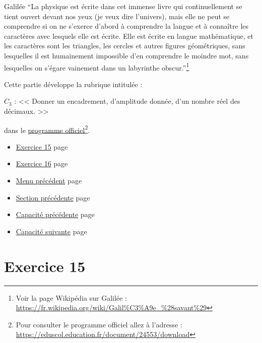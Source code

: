 \documentclass[a4paper,11pt]{book}
\begin{document}
\begin{myquote}{Galilée}
\enquote{La physique est écrite dans cet immense livre qui continuellement
se tient ouvert devant nos yeux (je veux dire l'univers), mais elle
ne peut se comprendre si on ne s'exerce d'abord à comprendre la
langue et à connaître les caractères avec lesquels elle est
écrite. Elle est écrite en langue mathématique, et les caractères
sont les triangles, les cercles et autres figures géométriques,
sans lesquelles il est humainement impossible d'en comprendre le
moindre mot, sans lesquelles on s'égare vainement dans un
labyrinthe obscur.}\footnote{Voir la page Wikipédia sur Galilée : \url{https://fr.wikipedia.org/wiki/Galil\%C3\%A9e_\%28savant\%29}}
\end{myquote}

\clearpage

Cette partie développe la rubrique intitulée :

\(C_{3}\) : << Donner un encadrement, d'amplitude
donnée, d'un nombre réel des décimaux. >>


dans le \href{https://eduscol.education.fr/document/24553/download}{programme officiel}\footnote{Pour consulter le programme officiel allez à l'adresse :
\url{https://eduscol.education.fr/document/24553/download}}.
\clearpage

\label{org67109aa}
\label{page:capacity3}
\begin{itemize}
\item \hyperref[org8cc10b8]{Exercice 15} page \pageref{page:sec3.4.1exo15}
\item \hyperref[org70c1962]{Exercice 16} page \pageref{page:sec3.4.2exo16}
\item \hyperref[orgb90956a]{Menu précédent} page \pageref{page:capacities-menu}
\item \hyperref[org7d5ffab]{Section précédente} page \pageref{page:sec3.3.2exo14}
\item \hyperref[org3ab5664]{Capacité précédente} page \pageref{page:sec3.3capacity2}
\item \hyperref[org67b7ea7]{Capacité suivante} page \pageref{page:sec3.5capacity4}
\end{itemize}



\clearpage

\section{Exercice 15}
\label{sec:orgb9ec665}
\label{org8cc10b8}
\label{page:sec3.4.1exo15}
\end{document}
